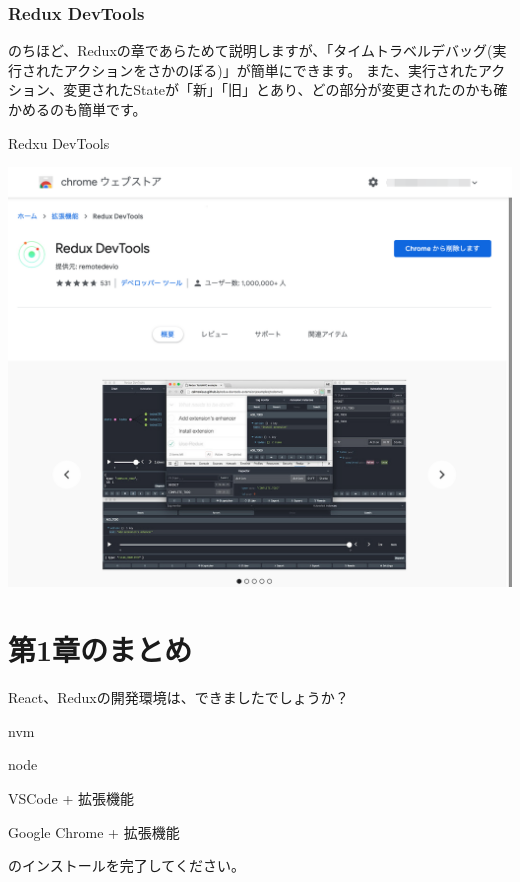 \subsubsection*{Redux DevTools}
\keeplastskip{
  \label{sec:1-3-1-2}
  \par\nobreak
}

のちほど、Reduxの章であらためて説明しますが、「タイムトラベルデバッグ(実行されたアクションをさかのぼる)」が簡単にできます。
また、実行されたアクション、変更されたStateが「新」「旧」とあり、どの部分が変更されたのかも確かめるのも簡単です。

Redxu DevTools

\begin{reviewimage}[H]%
\includegraphics[width=1.0\maxwidth]{./images/01-createDevEnv/01_11chromeExtReduxDevTools.png}%
\label{image:01-createDevEnv:01_11chromeExtReduxDevTools}
\end{reviewimage}

\section{第1章のまとめ}
\keeplastskip{
  \label{sec:1-4}
  \label{sec-chap01review}
  \par\nobreak
}

React、Reduxの開発環境は、できましたでしょうか？

\begin{starteritemize}
\item nvm
\item node
\item VSCode + 拡張機能
\item Google Chrome + 拡張機能
\end{starteritemize}

のインストールを完了してください。
